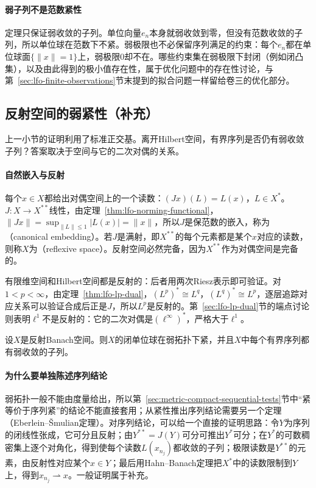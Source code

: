 \paragraph{弱子列不是范数紧性}
定理只保证弱收敛的子列。单位向量$e_n$本身就弱收敛到零，但没有范数收敛的子列，所以单位球在范数下不紧。弱极限也不必保留序列满足的约束：每个$e_n$都在单位球面$\{\|x\|=1\}$上，弱极限$0$却不在。哪些约束集在弱极限下封闭（例如闭凸集），以及由此得到的极小值存在性，属于优化问题中的存在性讨论，与第~\ref{sec:lfo-finite-observations}节末提到的拟合问题一样留给卷三的优化部分。

\subsection{反射空间的弱紧性（补充）}
\label{sec:lfo-reflexive}

上一小节的证明利用了标准正交基。离开Hilbert空间，有界序列是否仍有弱收敛子列？答案取决于空间与它的二次对偶的关系。

\paragraph{自然嵌入与反射}
每个$x\in X$都给出对偶空间上的一个读数：$(Jx)(L)=L(x)$，$L\in X^*$。$J:X\to X^{**}$线性，由定理~\ref{thm:lfo-norming-functional}，$\|Jx\|=\sup_{\|L\|\leq1}|L(x)|=\|x\|$，所以$J$是保范数的嵌入，称为（canonical embedding）。若$J$是满射，即$X^{**}$的每个元素都是某个$x$对应的读数，则称$X$为（reflexive space）。反射空间必然完备，因为$X^{**}$作为对偶空间是完备的。

有限维空间和Hilbert空间都是反射的：后者用两次Riesz表示即可验证。对$1<p<\infty$，由定理~\ref{thm:lfo-lp-dual}，$(L^p)^*\cong L^q$，$(L^q)^*\cong L^p$，逐层追踪对应关系可以验证合成后正是$J$，所以$L^p$是反射的。第~\ref{sec:lfo-lp-dual}节的端点讨论则表明$\ell^1$不是反射的：它的二次对偶是$(\ell^\infty)^*$，严格大于$\ell^1$。

\begin{theorem}[反射空间的弱紧性]
\label{thm:lfo-reflexive-compact}
设$X$是反射Banach空间。则$X$的闭单位球在弱拓扑下紧，并且$X$中每个有界序列都有弱收敛的子列。
\end{theorem}

\paragraph{为什么要单独陈述序列结论}
弱拓扑一般不能由度量给出，所以第~\ref{sec:metric-compact-sequential-tests}节中“紧等价于序列紧”的结论不能直接套用；从紧性推出序列结论需要另一个定理（Eberlein--Šmulian定理）。对序列结论，可以给一个直接的证明思路：令$Y$为序列的闭线性张成，它可分且反射；由$Y^{**}=J(Y)$可分可推出$Y^*$可分；在$Y^*$的可数稠密集上逐个对角化，得到使每个读数$L(x_{n_j})$都收敛的子列；极限读数是$Y^{**}$的元素，由反射性对应某个$x\in Y$；最后用Hahn--Banach定理把$X^*$中的读数限制到$Y$上，得到$x_{n_j}\rightharpoonup x$。一般证明属于补充。

